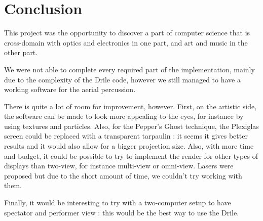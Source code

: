 \chapter{Conclusion}
This project was the opportunity to discover a part of computer science that is cross-domain with optics and electronics in one part, and art and music in the other part.

We were not able to complete every required part of the implementation, mainly due to the complexity of the Drile code, however we still managed to have a working software for the aerial percussion.

There is quite a lot of room for improvement, however. 
First, on the artistic side, the software can be made to look more appealing to the eyes, for instance by using textures and particles.
Also, for the Pepper's Ghost technique, the Plexiglas screen could be replaced with a transparent tarpaulin : it seems it gives better results and it would also allow for a bigger projection size.
Also, with more time and budget, it could be possible to try to implement the render for other types of displays than two-view, for instance multi-view or omni-view. Lasers were proposed but due to the short amount of time, we couldn't try working with them.

Finally, it would be interesting to try with a two-computer setup to have spectator and performer view : this would be the best way to use the Drile.
